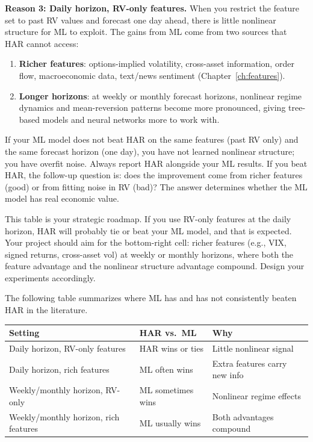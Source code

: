 \textbf{Reason 3: Daily horizon, RV-only features.}
When you restrict the feature set to past RV values and forecast one day ahead, there is little nonlinear structure for ML to exploit.
The gains from ML come from two sources that HAR cannot access:
\begin{enumerate}[nosep]
  \item \textbf{Richer features}: options-implied volatility, cross-asset information, order flow, macroeconomic data, text/news sentiment (Chapter~\ref{ch:features}).
  \item \textbf{Longer horizons}: at weekly or monthly forecast horizons, nonlinear regime dynamics and mean-reversion patterns become more pronounced, giving tree-based models and neural networks more to work with.
\end{enumerate}

\begin{keyidea}
If your ML model does not beat HAR on the same features (past RV only) and the same forecast horizon (one day), you have not learned nonlinear structure; you have overfit noise.
Always report HAR alongside your ML results.
If you beat HAR, the follow-up question is: does the improvement come from richer features (good) or from fitting noise in RV (bad)?
The answer determines whether the ML model has real economic value.
\end{keyidea}

\begin{projectconnection}
This table is your strategic roadmap.
If you use RV-only features at the daily horizon, HAR will probably tie or beat your ML model, and that is expected.
Your project should aim for the bottom-right cell: richer features (e.g., VIX, signed returns, cross-asset vol) at weekly or monthly horizons, where both the feature advantage and the nonlinear structure advantage compound.
Design your experiments accordingly.
\end{projectconnection}

The following table summarizes where ML has and has not consistently beaten HAR in the literature.

\begin{center}
\renewcommand{\arraystretch}{1.3}
\begin{tabular}{@{} l l l @{}}
\toprule
\textbf{Setting} & \textbf{HAR vs.\ ML} & \textbf{Why} \\
\midrule
Daily horizon, RV-only features & HAR wins or ties & Little nonlinear signal \\
Daily horizon, rich features & ML often wins & Extra features carry new info \\
Weekly/monthly horizon, RV-only & ML sometimes wins & Nonlinear regime effects \\
Weekly/monthly horizon, rich features & ML usually wins & Both advantages compound \\
\bottomrule
\end{tabular}
\end{center}

